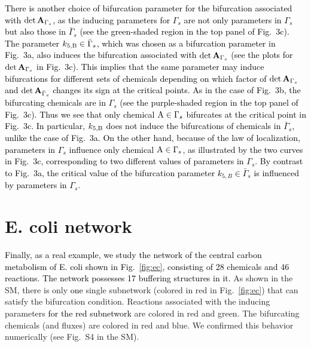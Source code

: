 \documentclass[ amsmath,amssymb,nofootinbib
]{revtex4-1}
\newcommand{\detA}{{\rm det}\,  {\bf A}}
\newcommand{\gs}{{\Gamma_s}}
\newcommand{\gbs}{{\bar{\Gamma}_s}}
\newcommand{\red}[1]{\textcolor{black}{#1}}
\newcommand{\corr}[1]{\textcolor{black}{#1}}
\newcommand{\green}[1]{\textcolor{black}{#1}}
\newcommand{\TO}[1]{\textcolor{black}{#1}}
\begin{document}
\corr{
There is another choice of bifurcation parameter  for the bifurcation associated with $\detA_{\Gamma_s}$,  as the inducing parameters for $\gs$ are not only parameters in $\gs$ but also those in $\gbs$  (see the green-shaded region in the top panel of Fig.~3c). 
 The parameter $k_{5,\rm B}\in \gbs$, which was  chosen as a bifurcation parameter in Fig.~3a, also induces the bifurcation associated with $\detA_{\Gamma_s}$ (see  the plots for $\detA_\gs$ in Fig.~3c).
This implies that the same parameter may induce bifurcations \red{for} different sets of chemicals depending on {which  factor 
of $\detA_{\Gamma_s}$ and $\detA_{\gbs}$ changes its sign}  at the critical points.
\textcolor{black}{As in the case of Fig.~3b, the bifurcating chemicals are in  $\Gamma_s$} (see the purple-shaded region \green{in}  the top panel of  Fig.~3c).
\textcolor{black}{Thus}  we  see that only chemical ${\rm A} \in \Gamma_s$ bifurcates at the critical point in Fig.~3c. \textcolor{black}{In particular, 
$k_{5,\rm B}$ does not induce the bifurcations of chemicals in $\gbs$, unlike the case of Fig.~3a.} On the other hand, because of  the law of localization, 
  parameters in  ${\Gamma_s}$
influence only  chemical ${\rm A} \in \gs$, as illustrated by the two curves in  Fig.~3c,  corresponding to  two different values of parameters in ${\gs}$. 
By contrast to Fig.~3a,
the critical value of the bifurcation parameter  $k_{5,B} \in {{\bar\Gamma}_s}$ is influenced by parameters in $\gs$.}




{%
\section{ E. coli network}\textcolor{black}{Finally, as a real example, we study the network of the
central carbon metabolism of E. coli \cite{OM} shown in Fig.~\ref{fig:ec}, consisting of 28 chemicals and 46 reactions. The network possesses 17 buffering structures in it.} 
 As shown in the SM, there is only \textcolor{black}{one} single subnetwork  (colored in red in Fig.~\ref{fig:ec}) that can satisfy the bifurcation condition. Reactions associated with the inducing parameters  \TO{for the red subnetwork} are colored in red and green. The bifurcating chemicals (and fluxes) are colored in red and blue. We confirmed this behavior numerically (see Fig.~S4 in the SM). 
}
\end{document}
